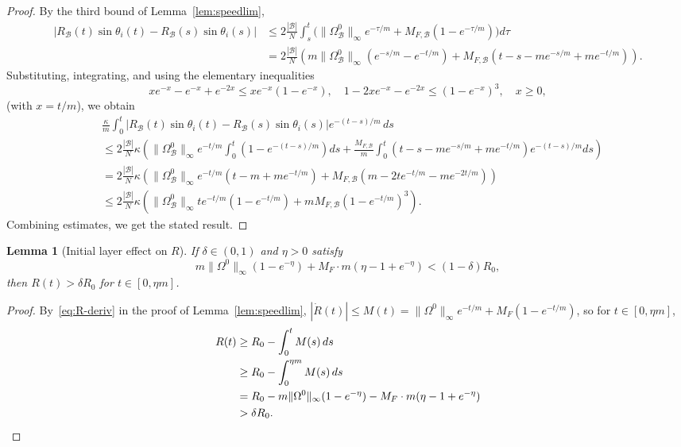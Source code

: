 \documentclass[11pt,reqno]{amsart}
\newtheorem{lemma}{Lemma}[section]
\theoremstyle{definition}
\theoremstyle{remark}
\begin{document}
\begin{proof}
By the third bound of Lemma~\ref{lem:speedlim},
\begin{align*}
	|R_\mathcal{B}(t)\sin\theta_i(t)-R_\mathcal{B}(s)\sin\theta_i(s)|
	&\le 2\frac{|\mathcal{B}|}{N}\int_s^t\bigl(\|\Omega_\mathcal{B}^0\|_\infty e^{-\tau/m}+M_{F,\mathcal{B}}(1-e^{-\tau/m})\bigr)d\tau\\
	&=2\frac{|\mathcal{B}|}{N}\left(m\|\Omega_\mathcal{B}^0\|_\infty(e^{-s/m}-e^{-t/m})+M_{F,\mathcal{B}}(t-s-me^{-s/m}+me^{-t/m})\right).
\end{align*}
Substituting, integrating, and using the elementary inequalities
\[
x e^{-x}-e^{-x}+e^{-2x}\le x e^{-x}(1-e^{-x}),\quad
1-2xe^{-x}-e^{-2x}\le(1-e^{-x})^{3},\quad x\ge 0,
\]
(with $x=t/m$), we obtain
\begin{align*}
&\frac{\kappa}{m}\int_0^t|R_\mathcal{B}(t)\sin\theta_i(t)-R_\mathcal{B}(s)\sin\theta_i(s)|e^{-(t-s)/m}\,ds\\
	&\le 2\frac{|\mathcal{B}|}{N}\kappa \left(\|\Omega_\mathcal{B}^0\|_\infty e^{-t/m}\int_0^t \left(1-e^{-(t-s)/m}\right)ds+\frac{ M_{F,\mathcal{B}}}{m}\int_0^t(t-s-me^{-s/m}+me^{-t/m})e^{-(t-s)/m}ds\right)\\
	&=2\frac{|\mathcal{B}|}{N}\kappa\left(\|\Omega_\mathcal{B}^0\|_\infty e^{-t/m}\left(t-m+me^{-t/m}\right)+ M_{F,\mathcal{B}}\left(m-2te^{-t/m}-me^{-2t/m}\right)\right)\\
	&\le 2\frac{|\mathcal{B}|}{N}\kappa \left(\|\Omega_\mathcal{B}^0\|_\infty te^{-t/m}(1-e^{-t/m})+m M_{F,\mathcal{B}}(1-e^{-t/m})^3\right).
\end{align*}
Combining estimates, we get the stated result.
\end{proof}

\begin{lemma}[Initial layer effect on $R$]\label{lem:initlayer}
If $\delta\in(0,1)$ and $\eta>0$ satisfy
\[
m\|\Omega^0\|_\infty(1-e^{-\eta})+M_F\cdot m(\eta-1+e^{-\eta})<(1-\delta)R_0,
\]
then $R(t)>\delta R_0$ for $t\in [0,\eta m]$.
\end{lemma}
\begin{proof}
By~\eqref{eq:R-deriv} in the proof of Lemma~\ref{lem:speedlim},
$|\dot R(t)|\le M(t)=\|\Omega^0\|_\infty e^{-t/m}+M_F(1-e^{-t/m})$,
so for $t\in [0,\eta m]$,
\begin{align*}
R(t)
&\ge R_0-\int_0^{t}M(s)\,ds\\
&\ge R_0-\int_0^{\eta m}M(s)\,ds\\
&=R_0-m\|\Omega^0\|_\infty(1-e^{-\eta})-M_F\cdot m(\eta-1+e^{-\eta})\\
&>\delta R_0. \qedhere
\end{align*}
\end{proof}
\end{document}
